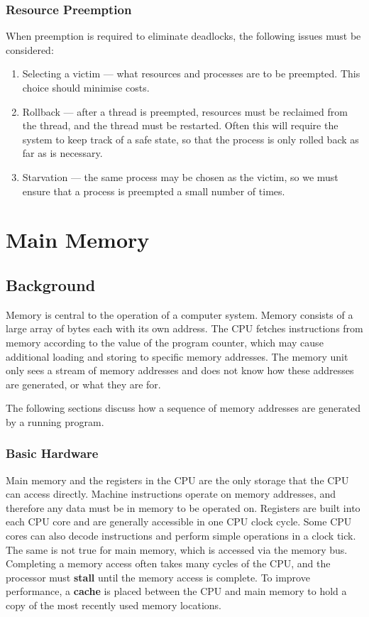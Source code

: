\documentclass{article}
\begin{document}
\subsubsection{Resource Preemption}
When preemption is required to eliminate deadlocks, the following
issues must be considered:
\begin{enumerate}
    \item Selecting a victim --- what resources and processes are to be
          preempted. This choice should minimise costs.
    \item Rollback --- after a thread is preempted, resources must be
          reclaimed from the thread, and the thread must be restarted.
          Often this will require the system to keep track of a safe
          state, so that the process is only rolled back as far as is
          necessary.
    \item Starvation --- the same process may be chosen as the victim,
          so we must ensure that a process is preempted a small number
          of times.
\end{enumerate}
\section{Main Memory}
\subsection{Background}
Memory is central to the operation of a computer system. Memory
consists of a large array of bytes each with its own address. The CPU
fetches instructions from memory according to the value of the program
counter, which may cause additional loading and storing to specific
memory addresses. The memory unit only sees a stream of memory
addresses and does not know how these addresses are generated, or what
they are for.

The following sections discuss how a sequence of memory addresses are
generated by a running program.
\subsubsection{Basic Hardware}
Main memory and the registers in the CPU are the only storage that the
CPU can access directly. Machine instructions operate on memory
addresses, and therefore any data must be in memory to be operated on.
Registers are built into each CPU core and are generally accessible in
one CPU clock cycle. Some CPU cores can also decode instructions and
perform simple operations in a clock tick. The same is not true for
main memory, which is accessed via the memory bus. Completing a memory
access often takes many cycles of the CPU, and the processor must
\textbf{stall} until the memory access is complete. To improve
performance, a \textbf{cache} is placed between the CPU and main memory
to hold a copy of the most recently used memory locations.
\end{document}
